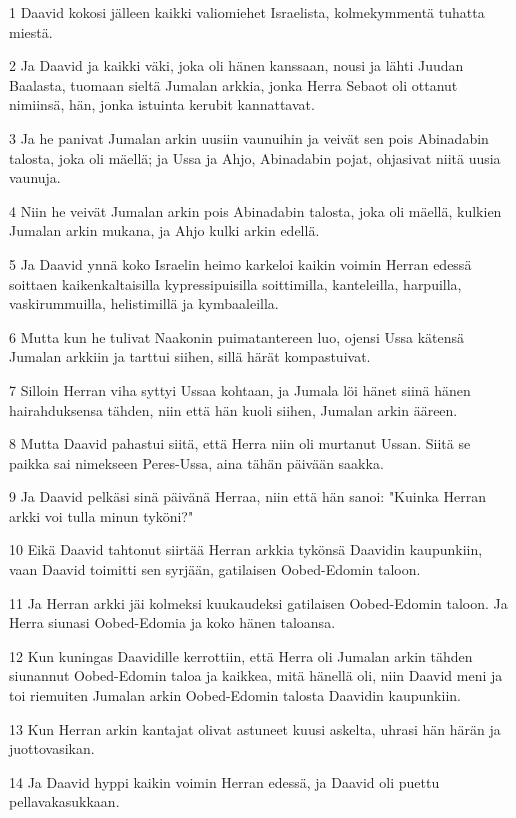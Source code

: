 \par 1 Daavid kokosi jälleen kaikki valiomiehet Israelista, kolmekymmentä tuhatta miestä.
\par 2 Ja Daavid ja kaikki väki, joka oli hänen kanssaan, nousi ja lähti Juudan Baalasta, tuomaan sieltä Jumalan arkkia, jonka Herra Sebaot oli ottanut nimiinsä, hän, jonka istuinta kerubit kannattavat.
\par 3 Ja he panivat Jumalan arkin uusiin vaunuihin ja veivät sen pois Abinadabin talosta, joka oli mäellä; ja Ussa ja Ahjo, Abinadabin pojat, ohjasivat niitä uusia vaunuja.
\par 4 Niin he veivät Jumalan arkin pois Abinadabin talosta, joka oli mäellä, kulkien Jumalan arkin mukana, ja Ahjo kulki arkin edellä.
\par 5 Ja Daavid ynnä koko Israelin heimo karkeloi kaikin voimin Herran edessä soittaen kaikenkaltaisilla kypressipuisilla soittimilla, kanteleilla, harpuilla, vaskirummuilla, helistimillä ja kymbaaleilla.
\par 6 Mutta kun he tulivat Naakonin puimatantereen luo, ojensi Ussa kätensä Jumalan arkkiin ja tarttui siihen, sillä härät kompastuivat.
\par 7 Silloin Herran viha syttyi Ussaa kohtaan, ja Jumala löi hänet siinä hänen hairahduksensa tähden, niin että hän kuoli siihen, Jumalan arkin ääreen.
\par 8 Mutta Daavid pahastui siitä, että Herra niin oli murtanut Ussan. Siitä se paikka sai nimekseen Peres-Ussa, aina tähän päivään saakka.
\par 9 Ja Daavid pelkäsi sinä päivänä Herraa, niin että hän sanoi: "Kuinka Herran arkki voi tulla minun tyköni?"
\par 10 Eikä Daavid tahtonut siirtää Herran arkkia tykönsä Daavidin kaupunkiin, vaan Daavid toimitti sen syrjään, gatilaisen Oobed-Edomin taloon.
\par 11 Ja Herran arkki jäi kolmeksi kuukaudeksi gatilaisen Oobed-Edomin taloon. Ja Herra siunasi Oobed-Edomia ja koko hänen taloansa.
\par 12 Kun kuningas Daavidille kerrottiin, että Herra oli Jumalan arkin tähden siunannut Oobed-Edomin taloa ja kaikkea, mitä hänellä oli, niin Daavid meni ja toi riemuiten Jumalan arkin Oobed-Edomin talosta Daavidin kaupunkiin.
\par 13 Kun Herran arkin kantajat olivat astuneet kuusi askelta, uhrasi hän härän ja juottovasikan.
\par 14 Ja Daavid hyppi kaikin voimin Herran edessä, ja Daavid oli puettu pellavakasukkaan.
